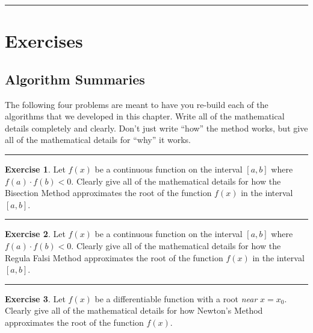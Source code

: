 \documentclass[
]{book}
\theoremstyle{definition}
\theoremstyle{definition}
\theoremstyle{definition}
\newtheorem{exercise}{Exercise}[chapter]
\theoremstyle{remark}
\begin{document}
\begin{center}\rule{0.5\linewidth}{0.5pt}\end{center}

\hypertarget{exercises-1}{%
\section{Exercises}\label{exercises-1}}

\hypertarget{algorithm-summaries}{%
\subsection{Algorithm Summaries}\label{algorithm-summaries}}

The following four problems are meant to have you re-build each of the
algorithms that we developed in this chapter. Write all of the
mathematical details completely and clearly. Don't just write ``how'' the
method works, but give all of the mathematical details for ``why'' it
works.

\begin{center}\rule{0.5\linewidth}{0.5pt}\end{center}

\begin{exercise}
\protect\hypertarget{exr:unnamed-chunk-116}{}{\label{exr:unnamed-chunk-116} }Let \(f(x)\) be a continuous function on the interval \([a,b]\) where
\(f(a) \cdot f(b) < 0\). Clearly give all of the mathematical details for how the
Bisection Method approximates the root of the function \(f(x)\) in the
interval \([a,b]\).
\end{exercise}

\begin{center}\rule{0.5\linewidth}{0.5pt}\end{center}

\begin{exercise}
\protect\hypertarget{exr:unnamed-chunk-117}{}{\label{exr:unnamed-chunk-117} }Let \(f(x)\) be a continuous function on the interval \([a,b]\) where
\(f(a) \cdot f(b) <  0\). Clearly give all of the mathematical details for how the Regula
Falsi Method approximates the root of the function \(f(x)\) in the
interval \([a,b]\).
\end{exercise}

\begin{center}\rule{0.5\linewidth}{0.5pt}\end{center}

\begin{exercise}
\protect\hypertarget{exr:unnamed-chunk-118}{}{\label{exr:unnamed-chunk-118} }Let \(f(x)\) be a differentiable function with a root \emph{near} \(x=x_0\).
Clearly give all of the mathematical details for how Newton's Method
approximates the root of the function \(f(x)\).
\end{exercise}
\end{document}
